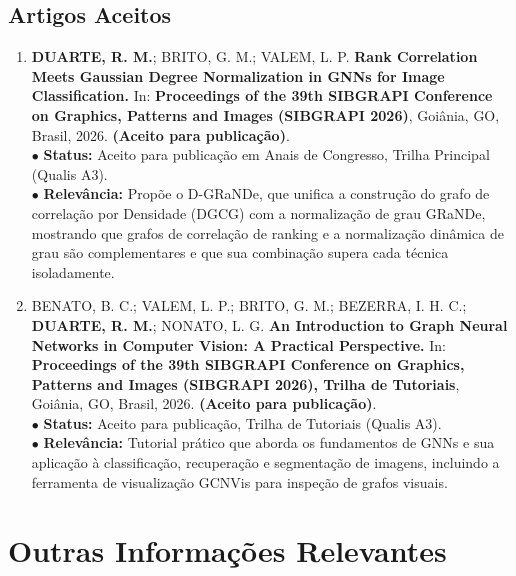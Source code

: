 \documentclass[a4paper,10pt]{article}
\begin{document}
\subsection{Artigos Aceitos}
\begin{enumerate}[label=\textbf{\arabic*}.]

    \item \textbf{DUARTE, R. M.}; BRITO, G. M.; VALEM, L. P. \textbf{Rank Correlation Meets Gaussian Degree Normalization in GNNs for Image Classification.} In: \textbf{Proceedings of the 39th SIBGRAPI Conference on Graphics, Patterns and Images (SIBGRAPI 2026)}, Goiânia, GO, Brasil, 2026. \textbf{(Aceito para publicação)}. \\
    $\bullet$ \textbf{Status:} Aceito para publicação em Anais de Congresso, Trilha Principal (Qualis A3). \\
    $\bullet$ \textbf{Relevância:} Propõe o D-GRaNDe, que unifica a construção do grafo de correlação por Densidade (DGCG) com a normalização de grau GRaNDe, mostrando que grafos de correlação de ranking e a normalização dinâmica de grau são complementares e que sua combinação supera cada técnica isoladamente.

    \item BENATO, B. C.; VALEM, L. P.; BRITO, G. M.; BEZERRA, I. H. C.; \textbf{DUARTE, R. M.}; NONATO, L. G. \textbf{An Introduction to Graph Neural Networks in Computer Vision: A Practical Perspective.} In: \textbf{Proceedings of the 39th SIBGRAPI Conference on Graphics, Patterns and Images (SIBGRAPI 2026), Trilha de Tutoriais}, Goiânia, GO, Brasil, 2026. \textbf{(Aceito para publicação)}. \\
    $\bullet$ \textbf{Status:} Aceito para publicação, Trilha de Tutoriais (Qualis A3). \\
    $\bullet$ \textbf{Relevância:} Tutorial prático que aborda os fundamentos de GNNs e sua aplicação à classificação, recuperação e segmentação de imagens, incluindo a ferramenta de visualização GCNVis para inspeção de grafos visuais.

\end{enumerate}

\section{Outras Informações Relevantes}
\end{document}
